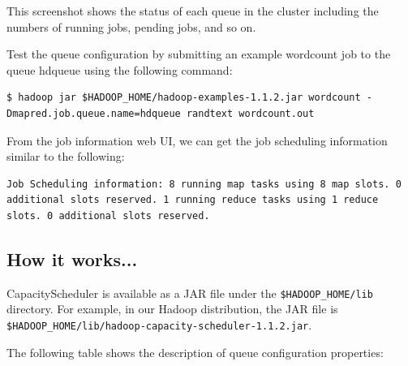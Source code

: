 This screenshot shows the status of each queue in the cluster including the numbers of running jobs, pending jobs, and so on. 

Test the queue configuration by submitting an example wordcount job to the queue hdqueue using the following command: 
\lstset{style=bashstyle}
\begin{lstlisting}
$ hadoop jar $HADOOP_HOME/hadoop-examples-1.1.2.jar wordcount -Dmapred.job.queue.name=hdqueue randtext wordcount.out
\end{lstlisting}

From the job information web UI, we can get the job scheduling information similar to the following: 
\lstset{style=bashstyle}
\begin{lstlisting}
Job Scheduling information: 8 running map tasks using 8 map slots. 0 additional slots reserved. 1 running reduce tasks using 1 reduce slots. 0 additional slots reserved.
\end{lstlisting}

\subsection*{How it works...}
CapacityScheduler is available as a JAR file under the \verb|$HADOOP_HOME/lib| directory. For example, in our Hadoop distribution, the JAR file is \verb|$HADOOP_HOME/lib/hadoop-capacity-scheduler-1.1.2.jar|.

The following table shows the description of queue configuration properties: 

